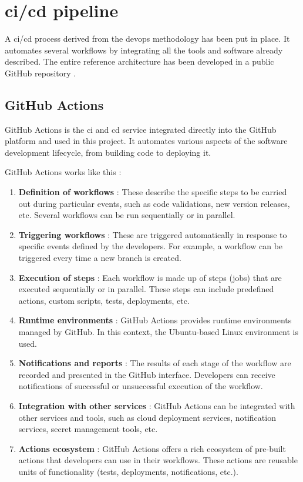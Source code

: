 \section{\texorpdfstring{\acrshort{ci}/\acrshort{cd}}{} pipeline}
A \acrshort{ci}/\acrshort{cd} process derived from the \acrshort{devops} methodology has been put in place. It automates several workflows by integrating all the tools and software already described. The entire reference architecture has been developed in a public GitHub repository \cite{aws_iot_reference_architecture}.

\subsection{GitHub Actions}
GitHub Actions is the \acrfull{ci} and \acrfull{cd} service integrated directly into the GitHub platform and used in this project. It automates various aspects of the software development lifecycle, from building code to deploying it.

GitHub Actions works like this :
\begin{enumerate}
    \item \textbf{Definition of workflows} : These describe the specific steps to be carried out during particular events, such as code validations, new version releases, etc. Several workflows can be run sequentially or in parallel.
    \item \textbf{Triggering workflows} : These are triggered automatically in response to specific events defined by the developers. For example, a workflow can be triggered every time a new branch is created.
    \item \textbf{Execution of steps} : Each workflow is made up of steps (jobs) that are executed sequentially or in parallel. These steps can include predefined actions, custom scripts, tests, deployments, etc.
    \item \textbf{Runtime environments} : GitHub Actions provides runtime environments managed by GitHub. In this context, the Ubuntu-based Linux environment is used.
    \item \textbf{Notifications and reports} : The results of each stage of the workflow are recorded and presented in the GitHub interface. Developers can receive notifications of successful or unsuccessful execution of the workflow.
    \item \textbf{Integration with other services} : GitHub Actions can be integrated with other services and tools, such as cloud deployment services, notification services, secret management tools, etc.
    \item \textbf{Actions ecosystem} : GitHub Actions offers a rich ecosystem of pre-built actions that developers can use in their workflows. These actions are reusable units of functionality (tests, deployments, notifications, etc.).
\end{enumerate}

